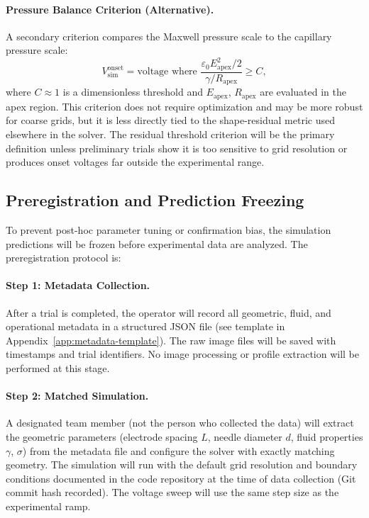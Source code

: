 \paragraph{Pressure Balance Criterion (Alternative).} A secondary criterion compares the Maxwell pressure scale to the capillary pressure scale:
\begin{equation}
V_{\mathrm{sim}}^{\mathrm{onset}} = \text{voltage where } \frac{\varepsilon_0 E_{\mathrm{apex}}^2 / 2}{\gamma / R_{\mathrm{apex}}} \geq C,
\end{equation}
where $C \approx 1$ is a dimensionless threshold and $E_{\mathrm{apex}}$, $R_{\mathrm{apex}}$ are evaluated in the apex region. This criterion does not require optimization and may be more robust for coarse grids, but it is less directly tied to the shape-residual metric used elsewhere in the solver. The residual threshold criterion will be the primary definition unless preliminary trials show it is too sensitive to grid resolution or produces onset voltages far outside the experimental range.

\subsection{Preregistration and Prediction Freezing}

To prevent post-hoc parameter tuning or confirmation bias, the simulation predictions will be frozen before experimental data are analyzed. The preregistration protocol is:

\paragraph{Step 1: Metadata Collection.} After a trial is completed, the operator will record all geometric, fluid, and operational metadata in a structured JSON file (see template in Appendix~\ref{app:metadata-template}). The raw image files will be saved with timestamps and trial identifiers. No image processing or profile extraction will be performed at this stage.

\paragraph{Step 2: Matched Simulation.} A designated team member (not the person who collected the data) will extract the geometric parameters (electrode spacing $L$, needle diameter $d$, fluid properties $\gamma$, $\sigma$) from the metadata file and configure the solver with exactly matching geometry. The simulation will run with the default grid resolution and boundary conditions documented in the code repository at the time of data collection (Git commit hash recorded). The voltage sweep will use the same step size as the experimental ramp.

